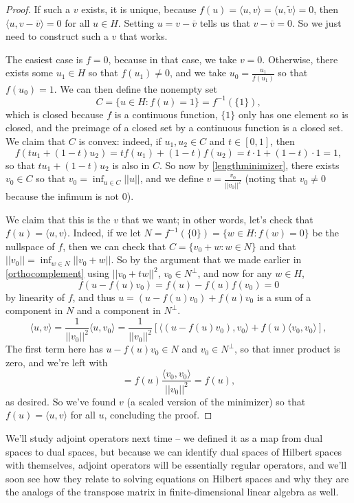 \begin{proof}
If such a $v$ exists, it is unique, because $f(u) = \langle u, v \rangle = \langle u, \tilde{v} \rangle = 0$, then $\langle u, v - \overline{v} \rangle = 0$ for all $u \in H$. Setting $u = v - \overline{v}$ tells us that $v - \overline{v} = 0$. So we just need to construct such a $v$ that works.

The easiest case is $f = 0$, because in that case, we take $v = 0$. Otherwise, there exists some $u_1 \in H$ so that $f(u_1) \ne 0$, and we take $u_0 = \frac{u_1}{f(u_1)}$ so that $f(u_0) = 1$. We can then define the nonempty set
\[
    C = \{u \in H: f(u) = 1\} = f^{-1}(\{1\}),
\] 
which is closed because $f$ is a continuous function, $\{1\}$ only has one element so is closed, and the preimage of a closed set by a continuous function is a closed set. We claim that $C$ is convex: indeed, if $u_1, u_2 \in C$ and $t \in [0, 1]$, then 
\[
    f(tu_1 + (1-t) u_2) = t f(u_1) + (1-t) f(u_2) = t \cdot 1 + (1-t) \cdot 1 = 1,
\]
so that $tu_1 + (1-t)u_2$ is also in $C$. So now by \cref{lengthminimizer}, there exists $v_0 \in C$ so that $v_0 = \inf_{u \in C} ||u||$, and we define $v = \frac{v_0}{||v_0||^2}$ (noting that $v_0 \ne 0$ because the infimum is not $0$). 

We claim that this is the $v$ that we want; in other words, let's check that $f(u) = \langle u, v \rangle$. Indeed, if we let $N = f^{-1}(\{0\}) = \{w \in H: f(w) = 0\}$ be the nullspace of $f$, then we can check that $C = \{v_0 + w: w \in N\}$ and that $||v_0|| = \inf_{w \in N} ||v_0 + w||$. So by the argument that we made earlier in \cref{orthocomplement} using $||v_0 + tw||^2$, $v_0 \in N^\perp$, and now for any $w \in H$,
\[
    f(u - f(u) v_0) = f(u) - f(u) f(v_0) = 0
\]
by linearity of $f$, and thus $u = (u - f(u) v_0) + f(u)v_0$ is a sum of a component in $N$ and a component in $N^\perp$. 
\[
    \langle u, v \rangle = \frac{1}{||v_0||^2} \langle u, v_0 \rangle = \frac{1}{||v_0||^2} \left[\langle (u - f(u) v_0), v_0 \rangle + f(u) \langle v_0, v_0 \rangle\right],
\]  
The first term here has $u - f(u) v_0 \in N$ and $v_0 \in N^\perp$, so that inner product is zero, and we're left with 
\[
    = f(u) \frac{\langle v_0, v_0 \rangle}{||v_0||^2} = f(u),
\]
as desired. So we've found $v$ (a scaled version of the minimizer) so that $f(u) = \langle u, v \rangle$ for all $u$, concluding the proof.
\end{proof}

We'll study adjoint operators next time -- we defined it as a map from dual spaces to dual spaces, but because we can identify dual spaces of Hilbert spaces with themselves, adjoint operators will be essentially regular operators, and we'll soon see how they relate to solving equations on Hilbert spaces and why they are the analogs of the transpose matrix in finite-dimensional linear algebra as well.